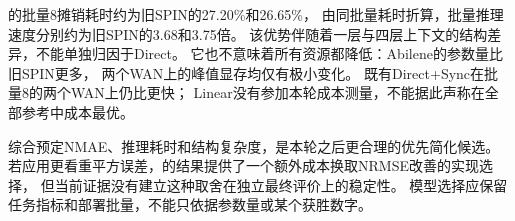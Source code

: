 \lite 的批量8摊销耗时约为旧SPIN的27.20\%和26.65\%，
由同批量耗时折算，批量推理速度分别约为旧SPIN的3.68和3.75倍。
该优势伴随着一层与四层上下文的结构差异，不能单独归因于Direct。
它也不意味着所有资源都降低：Abilene的参数量比旧SPIN更多，
两个WAN上的峰值显存均仅有极小变化。
既有Direct+Sync在批量8的两个WAN上仍比\lite 更快；
Linear没有参加本轮成本测量，不能据此声称在全部参考中成本最优。

综合预定NMAE、推理耗时和结构复杂度，\lite 是本轮之后更合理的优先简化候选。
若应用更看重平方误差，\full 的结果提供了一个额外成本换取NRMSE改善的实现选择，
但当前证据没有建立这种取舍在独立最终评价上的稳定性。
模型选择应保留任务指标和部署批量，不能只依据参数量或某个获胜数字。
